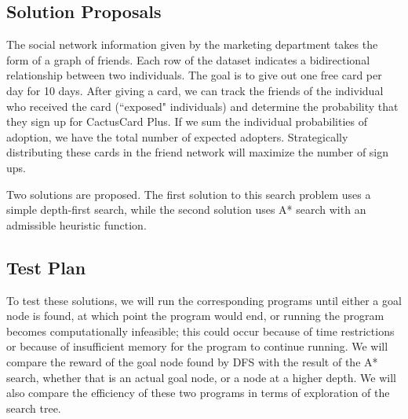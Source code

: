 \documentclass[11pt,journal]{IEEEtran}
\begin{document}
\subsection{Solution Proposals}
The social network information given by the marketing department takes the form of a graph of friends. Each row of the dataset indicates a bidirectional relationship between two individuals. The goal is to give out one free card per day for 10 days. After giving a card, we can track the friends of the individual who received the card (``exposed" individuals) and determine the probability that they sign up for CactusCard Plus. If we sum the individual probabilities of adoption, we have the total number of expected adopters. Strategically distributing these cards in the friend network will maximize the number of sign ups.
\par
Two solutions are proposed. The first solution to this search problem uses a simple depth-first search, while the second solution uses A* search with an admissible heuristic function.

\subsection{Test Plan}
To test these solutions, we will run the corresponding programs until either a goal node is found, at which point the program would end, or running the program becomes computationally infeasible; this could occur because of time restrictions or because of insufficient memory for the program to continue running. We will compare the reward of the goal node found by DFS with the result of the A* search, whether that is an actual goal node, or a node at a higher depth. We will also compare the efficiency of these two programs in terms of exploration of the search tree.
\end{document}
